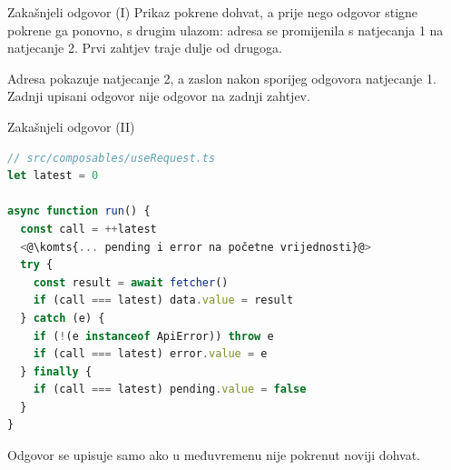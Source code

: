 \begin{frame}{Zakašnjeli odgovor (I)}
Prikaz pokrene dohvat, a prije nego odgovor stigne pokrene ga ponovno, s drugim ulazom: adresa se promijenila s natjecanja 1 na natjecanje 2. Prvi zahtjev traje dulje od drugoga.

\vspace{0.6em}
\begin{center}
\end{center}

\vspace{0.5em}
Adresa pokazuje natjecanje 2, a zaslon nakon sporijeg odgovora natjecanje 1. Zadnji upisani odgovor nije odgovor na zadnji zahtjev.
\end{frame}

\begin{frame}[fragile]{Zakašnjeli odgovor (II)}
\vspace{-0.3em}
\begin{lstlisting}[language=typescript]
// src/composables/useRequest.ts
let latest = 0

async function run() {
  const call = ++latest
  <@\komts{... pending i error na početne vrijednosti}@>
  try {
    const result = await fetcher()
    if (call === latest) data.value = result
  } catch (e) {
    if (!(e instanceof ApiError)) throw e
    if (call === latest) error.value = e
  } finally {
    if (call === latest) pending.value = false
  }
}
\end{lstlisting}

\vspace{0.1em}
Odgovor se upisuje samo ako u međuvremenu nije pokrenut noviji dohvat.
\end{frame}

